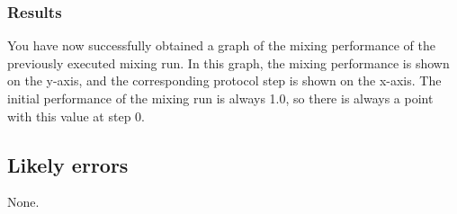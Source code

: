 \subsubsection{Results}
You have now successfully obtained a graph of the mixing performance of the previously executed mixing run. In this graph, the mixing performance is shown on the y-axis, and the corresponding protocol step is shown on the x-axis. The initial performance of the mixing run is always 1.0, so there is always a point with this value at step 0.

\subsection{Likely errors}
None.


%
%
%
%
%
%
